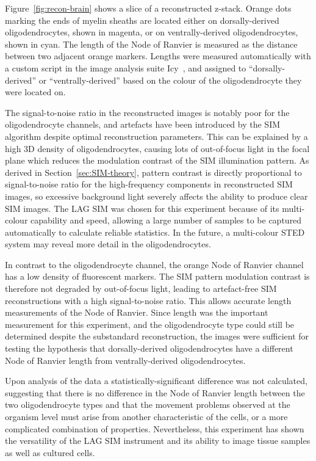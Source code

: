 Figure~\ref{fig:recon-brain} shows a slice of a reconstructed z-stack.
Orange dots marking the ends of myelin sheaths are located either on dorsally-derived oligodendrocytes, shown in magenta, or on ventrally-derived oligodendrocytes, shown in cyan.
The length of the Node of Ranvier is measured as the distance between two adjacent orange markers.
Lengths were measured automatically with a custom script in the image analysis suite Icy~\cite{de2012icy}, and assigned to ``dorsally-derived'' or ``ventrally-derived'' based on the colour of the oligodendrocyte they were located on.

The signal-to-noise ratio in the reconstructed images is notably poor for the oligodendrocyte channels, and artefacts have been introduced by the SIM algorithm despite optimal reconstruction parameters.
This can be explained by a high 3D density of oligodendrocytes, causing lots of out-of-focus light in the focal plane which reduces the modulation contrast of the SIM illumination pattern.
As derived in Section~\ref{sec:SIM-theory}, pattern contrast is directly proportional to signal-to-noise ratio for the high-frequency components in reconstructed SIM images, so excessive background light severely affects the ability to produce clear SIM images.
The LAG SIM was chosen for this experiment because of its multi-colour capability and speed, allowing a large number of samples to be captured automatically to calculate reliable statistics. 
In the future, a multi-colour STED system may reveal more detail in the oligodendrocytes. 

In contrast to the oligodendrocyte channel, the orange Node of Ranvier channel has a low density of fluorescent markers.
The SIM pattern modulation contrast is therefore not degraded by out-of-focus light, leading to artefact-free SIM reconstructions with a high signal-to-noise ratio.
This allows accurate length measurements of the Node of Ranvier.
Since length was the important measurement for this experiment, and the oligodendrocyte type could still be determined despite the substandard reconstruction, the images were sufficient for testing the hypothesis that dorsally-derived oligodendrocytes have a different Node of Ranvier length from ventrally-derived oligodendrocytes.

Upon analysis of the data a statistically-significant difference was not calculated, suggesting that there is no difference in the Node of Ranvier length between the two oligodendrocyte types and that the movement problems observed at the organism level must arise from another characteristic of the cells, or a more complicated combination of properties.
Nevertheless, this experiment has shown the versatility of the LAG SIM instrument and its ability to image tissue samples as well as cultured cells.

